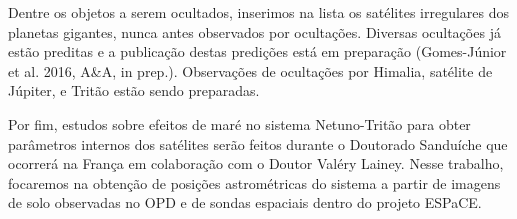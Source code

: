 \documentclass[12pt,a4paper]{report}
\begin{document}
Dentre os objetos a serem ocultados, inserimos na lista os satélites irregulares dos planetas gigantes, nunca antes observados por ocultações. Diversas ocultações já estão preditas e a publicação destas predições está em preparação (Gomes-Júnior et al. 2016, A\&A, in prep.). Observações de ocultações por Himalia, satélite de Júpiter, e Tritão estão sendo preparadas.

Por fim, estudos sobre efeitos de maré no sistema Netuno-Tritão para obter parâmetros internos dos satélites serão feitos durante o Doutorado Sanduíche que ocorrerá na França em colaboração com o Doutor Valéry Lainey. Nesse trabalho, focaremos na obtenção de posições astrométricas do sistema a partir de imagens de solo observadas no OPD e de sondas espaciais dentro do projeto ESPaCE.




\end{document}
